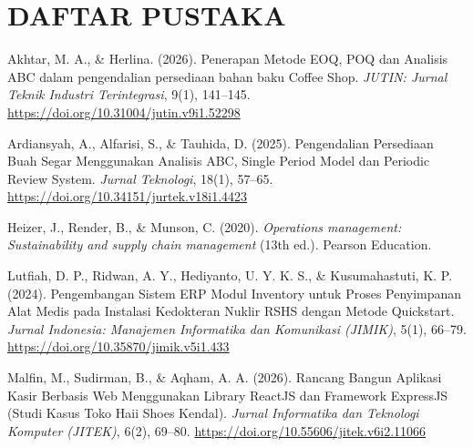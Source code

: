 \documentclass[11pt, a4paper]{article}
\begin{document}
\newpage
\section*{DAFTAR PUSTAKA}


\noindent\hangindent=0.75cm Akhtar, M. A., \& Herlina. (2026). Penerapan Metode EOQ, POQ dan Analisis ABC dalam pengendalian persediaan bahan baku Coffee Shop. \textit{JUTIN: Jurnal Teknik Industri Terintegrasi}, 9(1), 141--145. \url{https://doi.org/10.31004/jutin.v9i1.52298}

\vspace{0.25cm}
\noindent\hangindent=0.75cm Ardiansyah, A., Alfarisi, S., \& Tauhida, D. (2025). Pengendalian Persediaan Buah Segar Menggunakan Analisis ABC, Single Period Model dan Periodic Review System. \textit{Jurnal Teknologi}, 18(1), 57--65. \url{https://doi.org/10.34151/jurtek.v18i1.4423}

\vspace{0.25cm}
\noindent\hangindent=0.75cm Heizer, J., Render, B., \& Munson, C. (2020). \textit{Operations management: Sustainability and supply chain management} (13th ed.). Pearson Education.

\vspace{0.25cm}
\noindent\hangindent=0.75cm Lutfiah, D. P., Ridwan, A. Y., Hediyanto, U. Y. K. S., \& Kusumahastuti, K. P. (2024). Pengembangan Sistem ERP Modul Inventory untuk Proses Penyimpanan Alat Medis pada Instalasi Kedokteran Nuklir RSHS dengan Metode Quickstart. \textit{Jurnal Indonesia: Manajemen Informatika dan Komunikasi (JIMIK)}, 5(1), 66--79. \url{https://doi.org/10.35870/jimik.v5i1.433}

\vspace{0.25cm}
\noindent\hangindent=0.75cm Malfin, M., Sudirman, B., \& Aqham, A. A. (2026). Rancang Bangun Aplikasi Kasir Berbasis Web Menggunakan Library ReactJS dan Framework ExpressJS (Studi Kasus Toko Haii Shoes Kendal). \textit{Jurnal Informatika dan Teknologi Komputer (JITEK)}, 6(2), 69--80. \url{https://doi.org/10.55606/jitek.v6i2.11066}
\end{document}
